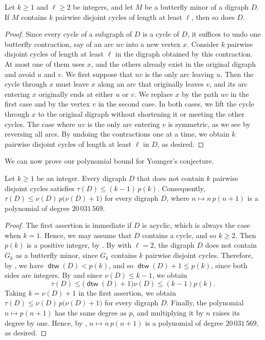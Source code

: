 \documentclass[fontsize=12pt,leading=14pt]{fullpaper}
\DeclareMathOperator{\dtw}{\mathsf{dtw}}
\begin{document}
\begin{lemma}\label{lem:butterfly-cycles}
  Let $k\ge1$ and $\ell\ge2$ be integers, and let $M$ be a butterfly minor of a digraph $D$.
  If $M$ contains $k$ pairwise disjoint cycles of length at least $\ell$, then so does $D$.
\end{lemma}

\begin{proof}
  Since every cycle of a subgraph of $D$ is a cycle of $D$, it suffices to undo one butterfly contraction, say of an arc $uv$ into a new vertex $x$.
  Consider $k$ pairwise disjoint cycles of length at least $\ell$ in the digraph obtained by this contraction.
  At most one of them uses $x$, and the others already exist in the original digraph and avoid $u$ and $v$.
  We first suppose that $uv$ is the only arc leaving $u$.
  Then the cycle through $x$ must leave $x$ along an arc that originally leaves $v$, and its arc entering $x$ originally ends at either $u$ or $v$.
  We replace $x$ by the path $uv$ in the first case and by the vertex $v$ in the second case.
  In both cases, we lift the cycle through $x$ to the original digraph without shortening it or meeting the other cycles.
  The case where $uv$ is the only arc entering $v$ is symmetric, as we see by reversing all arcs.
  By undoing the contractions one at a time, we obtain $k$ pairwise disjoint cycles of length at least $\ell$ in $D$, as desired.
\end{proof}

We can now prove our polynomial bound for Younger's conjecture.

\begin{corollary}\label{cor:younger}
  Let $k\ge1$ be an integer.
  Every digraph $D$ that does not contain $k$ pairwise disjoint cycles satisfies $\tau(D)\le(k-1)\,p(k)$.
  Consequently, $\tau(D)\le\nu(D)\,p\bigl(\nu(D)+1\bigr)$ for every digraph $D$, where $n\mapsto n\,p(n+1)$ is a polynomial of degree $20\,031\,569$.
\end{corollary}

\begin{proof}
  The first assertion is immediate if $D$ is acyclic, which is always the case when $k=1$.
  Hence, we may assume that $D$ contains a cycle, and so $k\ge2$.
  Then $p(k)$ is a positive integer, by .
  By  with $\ell=2$, the digraph $D$ does not contain $G_k$ as a butterfly minor, since $G_k$ contains $k$ pairwise disjoint cycles.
  Therefore, by , we have $\dtw(D)<p(k)$, and so $\dtw(D)+1\le p(k)$, since both sides are integers.
  By  and since $\nu(D)\le k-1$, we obtain
  \[
    \tau(D)\le\bigl(\dtw(D)+1\bigr)\nu(D)\le(k-1)p(k).
  \]
  Taking $k=\nu(D)+1$ in the first assertion, we obtain $\tau(D)\le\nu(D)\,p\bigl(\nu(D)+1\bigr)$ for every digraph $D$.
  Finally, the polynomial $n\mapsto p(n+1)$ has the same degree as $p$, and multiplying it by $n$ raises its degree by one.
  Hence, by , $n\mapsto n\,p(n+1)$ is a polynomial of degree $20\,031\,569$, as desired.
\end{proof}
\end{document}
